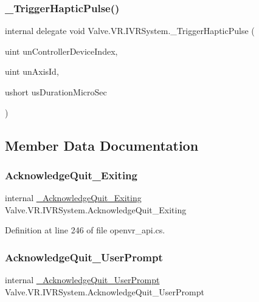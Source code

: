 \subsubsection{\texorpdfstring{\_TriggerHapticPulse()}{\_TriggerHapticPulse()}}
{\footnotesize\ttfamily internal delegate void Valve.\+V\+R.\+I\+V\+R\+System.\+\_\+\+Trigger\+Haptic\+Pulse (\begin{DoxyParamCaption}\item[{uint}]{un\+Controller\+Device\+Index,  }\item[{uint}]{un\+Axis\+Id,  }\item[{ushort}]{us\+Duration\+Micro\+Sec }\end{DoxyParamCaption})}



\subsection{Member Data Documentation}
\mbox{\label{struct_valve_1_1_v_r_1_1_i_v_r_system_a6b60311b536677d807becf55bada9760}} 
\subsubsection{\texorpdfstring{AcknowledgeQuit\_Exiting}{AcknowledgeQuit\_Exiting}}
{\footnotesize\ttfamily internal \mbox{\hyperlink{struct_valve_1_1_v_r_1_1_i_v_r_system_aa692c4d5b5097052364afcb966fd63cd}{\+\_\+\+Acknowledge\+Quit\+\_\+\+Exiting}} Valve.\+V\+R.\+I\+V\+R\+System.\+Acknowledge\+Quit\+\_\+\+Exiting}



Definition at line 246 of file openvr\+\_\+api.\+cs.

\mbox{\label{struct_valve_1_1_v_r_1_1_i_v_r_system_a400312901662b9450b7a450f18119ea0}} 
\subsubsection{\texorpdfstring{AcknowledgeQuit\_UserPrompt}{AcknowledgeQuit\_UserPrompt}}
{\footnotesize\ttfamily internal \mbox{\hyperlink{struct_valve_1_1_v_r_1_1_i_v_r_system_a4309327757a4f929aeb20c09f12f16b4}{\+\_\+\+Acknowledge\+Quit\+\_\+\+User\+Prompt}} Valve.\+V\+R.\+I\+V\+R\+System.\+Acknowledge\+Quit\+\_\+\+User\+Prompt}




